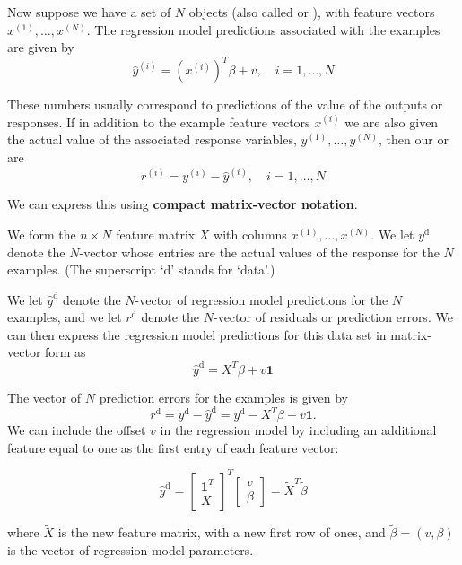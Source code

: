 Now suppose we have a set of $ N $ objects (also called  or ), with feature vectors $ x^{(1)}, \ldots, x^{(N)} $. The regression model predictions associated with the examples are given by
$$
\hat{y}^{(i)}=\left(x^{(i)}\right)^{T} \beta+v, \quad i=1, \ldots, N
$$

These numbers usually correspond to predictions of the value of the outputs or responses. If in addition to the example feature vectors $ x^{(i)} $ we are also given the actual value of the associated response variables, $ y^{(1)}, \ldots, y^{(N)} $, then our  or  are
$$
r^{(i)}=y^{(i)}-\hat{y}^{(i)}, \quad i=1, \ldots, N
$$

We can express this using \textbf{compact matrix-vector notation}. 

We form the $ n \times N $ feature matrix $ X $ with columns $ x^{(1)}, \ldots, x^{(N)} $. We let $ y^{\mathrm{d}} $ denote the $ N $-vector whose entries are the actual values of the response for the $ N $ examples. (The superscript `d' stands for `data'.) 

We let $ \hat{y}^{\mathrm{d}} $ denote the $ N $-vector of regression model predictions for the $ N $ examples, and we let $ r^{\mathrm{d}} $ denote the $ N $-vector of residuals or prediction errors. We can then express the regression model predictions for this data set in matrix-vector form as
$$
\hat{y}^{\mathrm{d}}=X^{T} \beta+v \mathbf{1}
$$

The vector of $ N $ prediction errors for the examples is given by
$$
r^{\mathrm{d}}=y^{\mathrm{d}}-\hat{y}^{\mathrm{d}}=y^{\mathrm{d}}-X^{T} \beta-v \mathbf{1} .
$$
We can include the offset $ v $ in the regression model by including an additional feature equal to one as the first entry of each feature vector:

\begin{problem}
    $$
\hat{y}^{\mathrm{d}}=\left[\begin{array}{c}
\mathbf{1}^{T} \\
X
\end{array}\right]^{T}\left[\begin{array}{l}
v \\
\beta
\end{array}\right]=\tilde{X}^{T} \tilde{\beta}
$$

where $ \tilde{X} $ is the new feature matrix, with a new first row of ones, and $ \tilde{\beta}=(v, \beta) $ is the vector of regression model parameters.
\end{problem}

